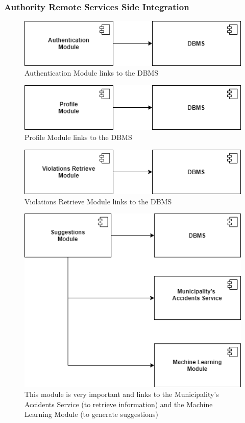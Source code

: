 \documentclass[12pt,a4paper]{article}
\begin{document}
\subsubsection{Authority Remote Services Side Integration}
\begin{figure}[H]
		\centering
		\includegraphics[width=0.5\linewidth]{../assets/images/auth_mod_auth_serv.png}
		\caption{Authentication Module links to the DBMS}
\end{figure}
\begin{figure}[H]
		\centering
		\includegraphics[width=0.5\linewidth]{../assets/images/prof_mod_auth_serv.png}
		\caption{Profile Module links to the DBMS}
\end{figure}
\begin{figure}[H]
		\centering
		\includegraphics[width=0.5\linewidth]{../assets/images/viol_retr_serv.png}
		\caption{Violations Retrieve Module links to the DBMS}
\end{figure}
\begin{figure}[H]
		\centering
		\includegraphics[width=0.5\linewidth]{../assets/images/sugg_mod_auth.png}
		\caption{This module is very important and links to the Municipality's Accidents Service (to retrieve information) and the Machine Learning Module (to generate suggestions)}
\end{figure}
\newpage
\end{document}
